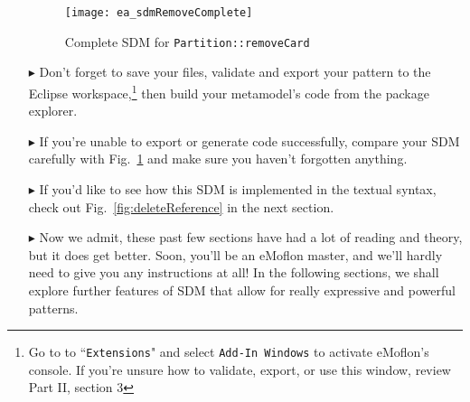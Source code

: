 \begin{itemize}
\vspace{0.5cm}

\begin{figure}[htbp]
\begin{center}
  \texttt{[image: ea\_sdmRemoveComplete]}
  \caption{Complete SDM for \texttt{Partition::removeCard}}  
  \label{fig:sdm_complete_control_flow}
\end{center}
\end{figure}

\vspace{0.5cm}

\item[$\blacktriangleright$]  Don't forget to save your files, validate and export your pattern to the Eclipse workspace,\footnote{Go to to
``\texttt{Extensions}" and select \texttt{Add-In Windows} to activate eMoflon's console. If you're unsure how to validate, export, or use this window, review
Part II, section 3} then build your metamodel's code from the package explorer.

\item[$\blacktriangleright$] If you're unable to export or generate code successfully, compare your SDM carefully with Fig.~\ref{fig:sdm_complete_control_flow}
and make sure you haven't forgotten anything.

\item[$\blacktriangleright$] If you'd like to see how this SDM is implemented in the textual syntax, check out Fig.~\ref{fig:deleteReference} in the next
section.

\item[$\blacktriangleright$] Now we admit, these past few sections have had a lot of reading and theory, but it does get better. Soon, you'll be an eMoflon
master, and we'll hardly need to give you any instructions at all! In the following sections, we shall explore further features of SDM that allow for really expressive and
powerful patterns.


\end{itemize}

